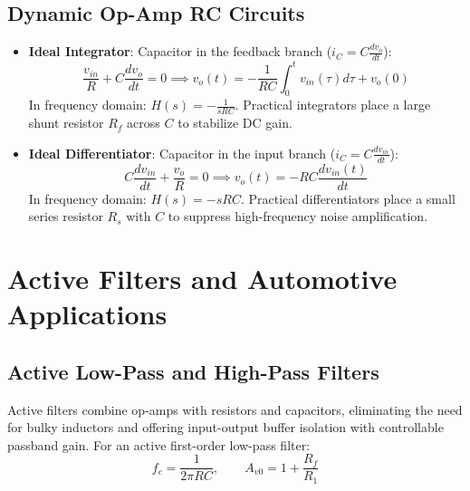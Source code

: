 \subsection{Dynamic Op-Amp RC Circuits}
\begin{itemize}[leftmargin=1.5em]
    \item \textbf{Ideal Integrator}: Capacitor in the feedback branch ($i_C = C \frac{dv_o}{dt}$):
    \begin{equation}
    \frac{v_{in}}{R} + C \frac{dv_o}{dt} = 0 \implies v_o(t) = -\frac{1}{RC}\int_0^t v_{in}(\tau) d\tau + v_o(0)
    \end{equation}
    In frequency domain: $H(s) = -\frac{1}{s RC}$. Practical integrators place a large shunt resistor $R_f$ across $C$ to stabilize DC gain.
    \item \textbf{Ideal Differentiator}: Capacitor in the input branch ($i_C = C \frac{dv_{in}}{dt}$):
    \begin{equation}
    C \frac{dv_{in}}{dt} + \frac{v_o}{R} = 0 \implies v_o(t) = -RC \frac{dv_{in}(t)}{dt}
    \end{equation}
    In frequency domain: $H(s) = -s RC$. Practical differentiators place a small series resistor $R_s$ with $C$ to suppress high-frequency noise amplification.
\end{itemize}

\section{Active Filters and Automotive Applications}

\subsection{Active Low-Pass and High-Pass Filters}
Active filters combine op-amps with resistors and capacitors, eliminating the need for bulky inductors and offering input-output buffer isolation with controllable passband gain.
For an active first-order low-pass filter:
\begin{equation}
f_c = \frac{1}{2\pi R C}, \qquad A_{v0} = 1 + \frac{R_f}{R_1}
\end{equation}


